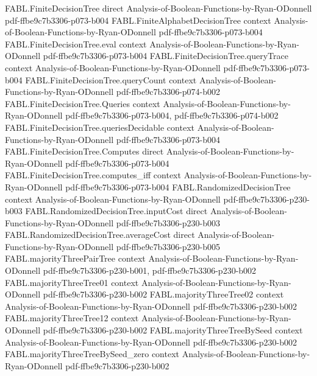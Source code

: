 \begin{theorem}
\proofstep
  {FABL.FiniteDecisionTree}
  {direct}
  {Analysis-of-Boolean-Functions-by-Ryan-ODonnell}
  {pdf-ffbe9c7b3306-p073-b004}
\proofstep
  {FABL.FiniteAlphabetDecisionTree}
  {context}
  {Analysis-of-Boolean-Functions-by-Ryan-ODonnell}
  {pdf-ffbe9c7b3306-p073-b004}
\proofstep
  {FABL.FiniteDecisionTree.eval}
  {context}
  {Analysis-of-Boolean-Functions-by-Ryan-ODonnell}
  {pdf-ffbe9c7b3306-p073-b004}
\proofstep
  {FABL.FiniteDecisionTree.queryTrace}
  {context}
  {Analysis-of-Boolean-Functions-by-Ryan-ODonnell}
  {pdf-ffbe9c7b3306-p073-b004}
\proofstep
  {FABL.FiniteDecisionTree.queryCount}
  {context}
  {Analysis-of-Boolean-Functions-by-Ryan-ODonnell}
  {pdf-ffbe9c7b3306-p074-b002}
\proofstep
  {FABL.FiniteDecisionTree.Queries}
  {context}
  {Analysis-of-Boolean-Functions-by-Ryan-ODonnell}
  {pdf-ffbe9c7b3306-p073-b004,
    pdf-ffbe9c7b3306-p074-b002}
\proofstep
  {FABL.FiniteDecisionTree.queriesDecidable}
  {context}
  {Analysis-of-Boolean-Functions-by-Ryan-ODonnell}
  {pdf-ffbe9c7b3306-p073-b004}
\proofstep
  {FABL.FiniteDecisionTree.Computes}
  {direct}
  {Analysis-of-Boolean-Functions-by-Ryan-ODonnell}
  {pdf-ffbe9c7b3306-p073-b004}
\proofstep
  {FABL.FiniteDecisionTree.computes_iff}
  {context}
  {Analysis-of-Boolean-Functions-by-Ryan-ODonnell}
  {pdf-ffbe9c7b3306-p073-b004}
\proofstep
  {FABL.RandomizedDecisionTree}
  {context}
  {Analysis-of-Boolean-Functions-by-Ryan-ODonnell}
  {pdf-ffbe9c7b3306-p230-b003}
\proofstep
  {FABL.RandomizedDecisionTree.inputCost}
  {direct}
  {Analysis-of-Boolean-Functions-by-Ryan-ODonnell}
  {pdf-ffbe9c7b3306-p230-b003}
\proofstep
  {FABL.RandomizedDecisionTree.averageCost}
  {direct}
  {Analysis-of-Boolean-Functions-by-Ryan-ODonnell}
  {pdf-ffbe9c7b3306-p230-b005}
\proofstep
  {FABL.majorityThreePairTree}
  {context}
  {Analysis-of-Boolean-Functions-by-Ryan-ODonnell}
  {pdf-ffbe9c7b3306-p230-b001,
    pdf-ffbe9c7b3306-p230-b002}
\proofstep
  {FABL.majorityThreeTree01}
  {context}
  {Analysis-of-Boolean-Functions-by-Ryan-ODonnell}
  {pdf-ffbe9c7b3306-p230-b002}
\proofstep
  {FABL.majorityThreeTree02}
  {context}
  {Analysis-of-Boolean-Functions-by-Ryan-ODonnell}
  {pdf-ffbe9c7b3306-p230-b002}
\proofstep
  {FABL.majorityThreeTree12}
  {context}
  {Analysis-of-Boolean-Functions-by-Ryan-ODonnell}
  {pdf-ffbe9c7b3306-p230-b002}
\proofstep
  {FABL.majorityThreeTreeBySeed}
  {context}
  {Analysis-of-Boolean-Functions-by-Ryan-ODonnell}
  {pdf-ffbe9c7b3306-p230-b002}
\proofstep
  {FABL.majorityThreeTreeBySeed_zero}
  {context}
  {Analysis-of-Boolean-Functions-by-Ryan-ODonnell}
  {pdf-ffbe9c7b3306-p230-b002}
\proofstep

\end{theorem}
